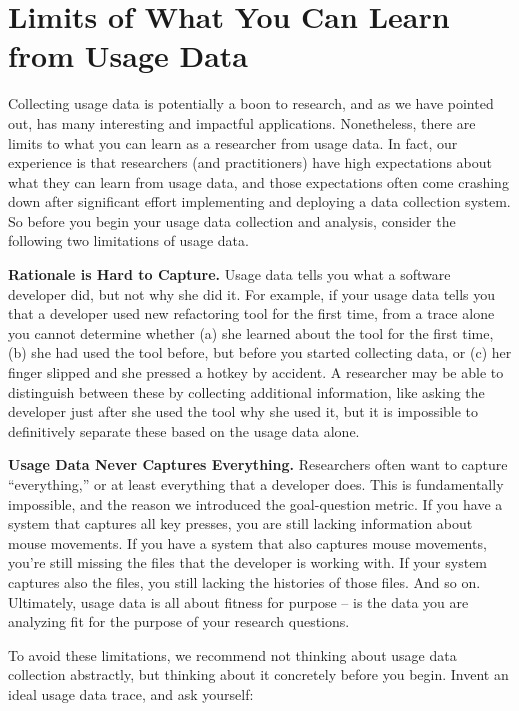 \section{Limits of What You Can Learn from Usage Data}
\label{sec:limitations}

Collecting usage data is potentially a boon to research, and as we have
pointed out, has many interesting and impactful applications.
Nonetheless, there are limits to what you can learn as a researcher
from usage data.
In fact, our experience is that researchers (and practitioners) have 
high expectations about what they can learn from usage data, and those
expectations often come crashing down after significant effort implementing
and deploying a data collection system.
So before you begin your usage data collection and analysis, consider
the following two limitations of usage data.

\textbf{Rationale is Hard to Capture.}
Usage data tells you what a software developer did, but not
why she did it.
For example, if your usage data tells you that a developer used 
new refactoring tool for the first time, from a trace alone you cannot determine whether
(a) she learned about the tool for the first time, (b) she had used the tool before,
but before you started collecting data, or (c) her finger slipped and 
she pressed a hotkey by accident.
A researcher may be able to distinguish between these by collecting additional information,
like asking the developer just after she used the tool why she used it,
but it is impossible to definitively separate these based on the 
usage data alone.

\textbf{Usage Data Never Captures Everything.}
Researchers often want to capture ``everything,'' or at least 
everything that a developer does.
This is fundamentally impossible, and the reason we introduced the 
goal-question metric.
If you have a system that captures all key presses, you are still 
lacking information about mouse movements.
If you have a system that also captures mouse movements, you're still
missing the files that the developer is working with.
If your system captures also the files, you still lacking the 
histories of those files.
And so on.
Ultimately, usage data is all about fitness for purpose -- is the data
you are analyzing fit for the purpose of your research questions.

To avoid these limitations, we recommend not thinking about 
usage data collection abstractly, but thinking about it concretely before
you begin.
Invent an ideal usage data trace, and ask yourself:

